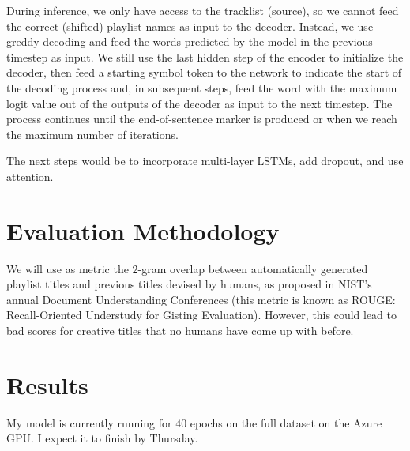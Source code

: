 \documentclass{article} %
\begin{document}
\begin{enumerate}[label = (\alph*)]
        During inference, we only have access to the tracklist (source), so we cannot feed the correct (shifted) playlist names as input to the decoder. 
        Instead, we use greddy decoding and feed the words predicted by the model in the previous timestep as input.
        We still use the last hidden step of the encoder to initialize the decoder, then feed a starting symbol token to the network to indicate the start of the decoding process and, in subsequent steps, feed the word with the maximum logit value out of the outputs of the decoder as input to the next timestep.
        The process continues until the end-of-sentence marker is produced or when we reach the maximum number of iterations. 
\end{enumerate}

The next steps would be to incorporate multi-layer LSTMs, add dropout, and use attention. 


\section{Evaluation Methodology}
\label{eval}

We will use as metric the $2$-gram overlap between automatically generated playlist titles and previous titles devised by humans, as proposed in NIST's annual Document Understanding Conferences (this metric is known as ROUGE: Recall-Oriented Understudy for Gisting Evaluation).
However, this could lead to bad scores for creative titles that no humans have come up with before.

\section{Results}
\label{results}
My model is currently running for $40$ epochs on the full dataset on the Azure GPU. I expect it to finish by Thursday.



\end{document}
